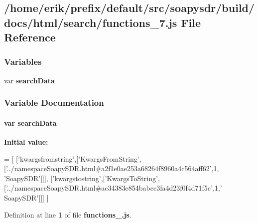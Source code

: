 \subsection{/home/erik/prefix/default/src/soapysdr/build/docs/html/search/functions\+\_\+7.js File Reference}
\label{functions__7_8js}
\subsubsection*{Variables}
\begin{DoxyCompactItemize}
\item 
var {\bf search\+Data}
\end{DoxyCompactItemize}


\subsubsection{Variable Documentation}
\paragraph[{search\+Data}]{\setlength{\rightskip}{0pt plus 5cm}var search\+Data}\label{functions__7_8js_ad01a7523f103d6242ef9b0451861231e}
{\bfseries Initial value\+:}
\begin{DoxyCode}
=
[
  [\textcolor{stringliteral}{'kwargsfromstring'},[\textcolor{stringliteral}{'KwargsFromString'},[\textcolor{stringliteral}{'../namespaceSoapySDR.html#a2f1e0ae253a68264f8960a4c564aff62'},1,\textcolor{stringliteral}{
      'SoapySDR'}]]],
  [\textcolor{stringliteral}{'kwargstostring'},[\textcolor{stringliteral}{'KwargsToString'},[\textcolor{stringliteral}{'../namespaceSoapySDR.html#ac34383e854babcc3fa4d23f0f4d71f5c'},1,\textcolor{stringliteral}{'
      SoapySDR'}]]]
]
\end{DoxyCode}


Definition at line {\bf 1} of file {\bf functions\+\_.\+js}.

